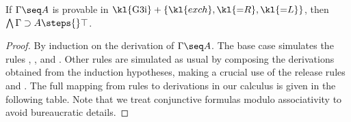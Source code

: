 \begin{scope}
\begin{theorem} If
  $\Gamma \seq A$ is provable in $\text{\kl{G3i}} + \{\kl{exch}, \kl{{=}R},
  \kl{{=}L}\}$, then $\bigwedge \Gamma \limp A \steps{} \top$.
\end{theorem}
\begin{proof}
  By induction on the derivation of $\Gamma \seq A$. The base case simulates the
  rules {}, {}, {} and {}. Other rules
  are simulated as usual by composing the derivations obtained from the
  induction hypotheses, making a crucial use of the release rules {}
  and {}. The full mapping from  rules to
  derivations in our  calculus is given in the following
  table. Note that we treat conjunctive formulas modulo associativity to avoid
  bureaucratic details.


\end{proof}
\end{scope}
